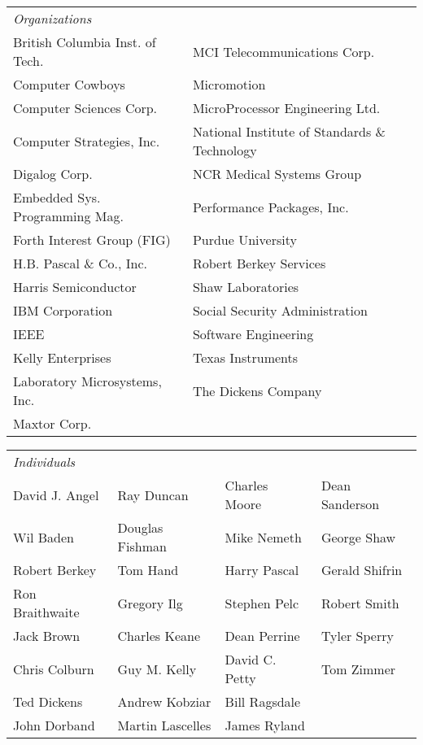 \begin{supertabular}{p{0.5\textwidth}p{0.5\textwidth}}
\emph{Organizations} \\
British Columbia Inst. of Tech.		& MCI Telecommunications Corp. \\
Computer Cowboys					& Micromotion \\
Computer Sciences Corp.				& MicroProcessor Engineering Ltd. \\
Computer Strategies, Inc.			& National Institute of Standards \& Technology \\
Digalog Corp.						& NCR Medical Systems Group \\
Embedded Sys. Programming Mag.		& Performance Packages, Inc. \\
Forth Interest Group (FIG)			& Purdue University \\
H.B. Pascal \& Co., Inc.			& Robert Berkey Services \\
Harris Semiconductor				& Shaw Laboratories \\
IBM Corporation						& Social Security Administration \\
IEEE								& Software Engineering \\
Kelly Enterprises					& Texas Instruments \\
Laboratory Microsystems, Inc.		& The Dickens Company \\
Maxtor Corp.						\\
\end{supertabular}

\begin{supertabular}{p{0.25\textwidth}p{0.25\textwidth}p{0.25\textwidth}p{0.25\textwidth}}
\emph{Individuals} \\
David J. Angel	& Ray Duncan		& Charles Moore	& Dean Sanderson\\
Wil Baden		& Douglas Fishman	& Mike Nemeth	& George Shaw	\\
Robert Berkey	& Tom Hand			& Harry Pascal	& Gerald Shifrin\\
Ron Braithwaite	& Gregory Ilg		& Stephen Pelc	& Robert Smith	\\
Jack Brown		& Charles Keane		& Dean Perrine	& Tyler Sperry	\\
Chris Colburn	& Guy M. Kelly		& David C. Petty& Tom Zimmer	\\
Ted Dickens		& Andrew Kobziar	& Bill Ragsdale	\\
John Dorband	& Martin Lascelles	& James Ryland	\\
\end{supertabular}
